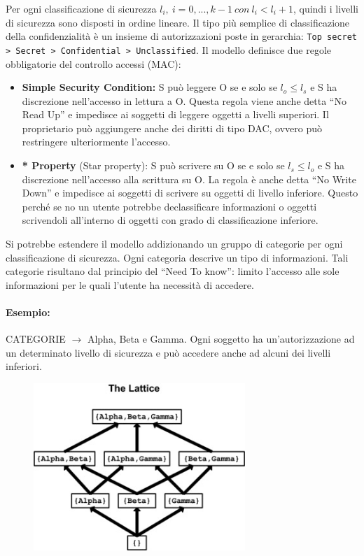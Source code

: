 Per ogni classificazione di sicurezza \(l_i, \ i=0,...,k-1 \ con \ l_i<l_i+1\),
quindi i livelli di sicurezza sono
disposti in ordine lineare.
Il tipo più semplice di classificazione della confidenzialità è un insieme di
autorizzazioni poste in
gerarchia: \verb|Top secret > Secret > Confidential > Unclassified|.
Il modello definisce due regole obbligatorie del controllo accessi (MAC):
\begin{itemize}
      \item \textbf{Simple Security Condition:} S può leggere O se e solo se
            \(l_o \le l_s\) e S ha discrezione
            nell'accesso in lettura a O. Questa regola viene anche detta “No Read Up”
            e impedisce ai
            soggetti di leggere oggetti a livelli superiori. Il proprietario può
            aggiungere anche dei diritti di
            tipo DAC, ovvero può restringere ulteriormente l'accesso.
      \item \textbf{* Property} (Star property): S può scrivere su O se e solo
            se \(l_s \le l_o\) e S ha discrezione
            nell'accesso alla scrittura su O. La regola è anche detta “No Write Down”
            e impedisce ai
            soggetti di scrivere su oggetti di livello inferiore. Questo perché se no
            un utente potrebbe declassificare
            informazioni o oggetti scrivendoli all'interno di oggetti con grado di
            classificazione inferiore.
\end{itemize}

Si potrebbe estendere il modello addizionando un gruppo di categorie per ogni
classificazione di
sicurezza. Ogni categoria descrive un tipo di informazioni.
Tali categorie risultano dal principio del “Need To know”: limito l'accesso alle
sole informazioni per
le quali l'utente ha necessità di accedere.

\paragraph{Esempio:}
CATEGORIE \(\rightarrow\) Alpha, Beta e Gamma.
Ogni soggetto ha un'autorizzazione ad un determinato livello di sicurezza e può
accedere anche
ad alcuni dei livelli inferiori.

\begin{figure}[H]
      \centering
      \includegraphics[width=8cm, keepaspectratio]{capitoli/policy/imgs/Lattuce.jpg}
\end{figure}

